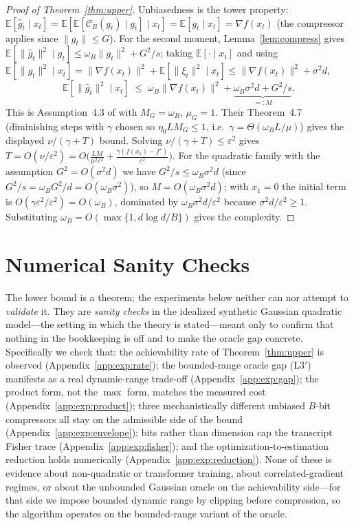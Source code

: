 \documentclass[11pt]{article}
\theoremstyle{definition}
\newcommand{\E}{\mathbb{E}}
\newcommand{\eps}{\varepsilon}
\newcommand{\Ccal}{\mathcal{C}}
\begin{document}
\begin{proof}[Proof of Theorem~\ref{thm:upper}]
Unbiasedness is the tower property:
$\E[\hat g_t\mid x_t]=\E[\E[\Ccal_B(g_t)\mid g_t]\mid x_t]=\E[g_t\mid x_t]=\nabla f(x_t)$ (the compressor
applies since $\|g_t\|\le G$). For the second moment, Lemma~\ref{lem:compress} gives
$\E[\|\hat g_t\|^2\mid g_t]\le\omega_B\|g_t\|^2+G^2/s$; taking $\E[\cdot\mid x_t]$ and using
$\E[\|g_t\|^2\mid x_t]=\|\nabla f(x_t)\|^2+\E[\|\xi_t\|^2\mid x_t]\le\|\nabla f(x_t)\|^2+\sigma^2 d$,
\[
  \E[\|\hat g_t\|^2\mid x_t]\;\le\;\omega_B\|\nabla f(x_t)\|^2+\underbrace{\omega_B\sigma^2 d+G^2/s}_{=:M}.
\]
This is Assumption~4.3 of \citet{bottou2018optimization} with $M_G=\omega_B$, $\mu_G=1$. Their
Theorem~4.7 (diminishing steps with $\gamma$ chosen so $\eta_0 LM_G\le1$, i.e.\ $\gamma=\Theta(\omega_B L/\mu)$)
gives the displayed $\nu/(\gamma+T)$ bound. Solving $\nu/(\gamma+T)\le\eps^2$ gives
$T=O(\nu/\eps^2)=O\big(\tfrac{LM}{\mu^2\eps^2}+\tfrac{\gamma(f(x_1)-f^\star)}{\eps^2}\big)$. For the
quadratic family with the assumption $G^2=O(\sigma^2 d)$ we have $G^2/s\le\omega_B\sigma^2 d$ (since
$G^2/s=\omega_B G^2/d=O(\omega_B\sigma^2)$), so $M=O(\omega_B\sigma^2 d)$; with $x_1=0$ the initial term
is $O(\gamma\eps^2/\eps^2)=O(\omega_B)$, dominated by $\omega_B\sigma^2 d/\eps^2$ because
$\sigma^2 d/\eps^2\ge1$. Substituting $\omega_B=O(\max\{1,d\log d/B\})$ gives the complexity.
\end{proof}

\section{Numerical Sanity Checks}
\label{app:exp}

The lower bound is a theorem; the experiments below neither can nor attempt to \emph{validate} it.
They are \emph{sanity checks} in the idealized synthetic Gaussian quadratic model---the setting in which
the theory is stated---meant only to confirm that nothing in the bookkeeping is off and to make the
oracle gap concrete. Specifically we check that: the achievability rate of Theorem~\ref{thm:upper} is
observed (Appendix~\ref{app:exp:rate}); the bounded-range oracle gap (L3$'$) manifests as a real
dynamic-range trade-off (Appendix~\ref{app:exp:gap}); the product form, not the $\max$ form, matches the
measured cost (Appendix~\ref{app:exp:product}); three mechanistically different unbiased $B$-bit
compressors all stay on the admissible side of the bound (Appendix~\ref{app:exp:envelope}); bits rather
than dimension cap the transcript Fisher trace (Appendix~\ref{app:exp:fisher}); and the
optimization-to-estimation reduction holds numerically (Appendix~\ref{app:exp:reduction}). None of these
is evidence about non-quadratic or transformer training, about correlated-gradient regimes, or about the
unbounded Gaussian oracle on the achievability side---for that side we impose bounded dynamic range by
clipping before compression, so the algorithm operates on the bounded-range variant of the oracle.
\end{document}
